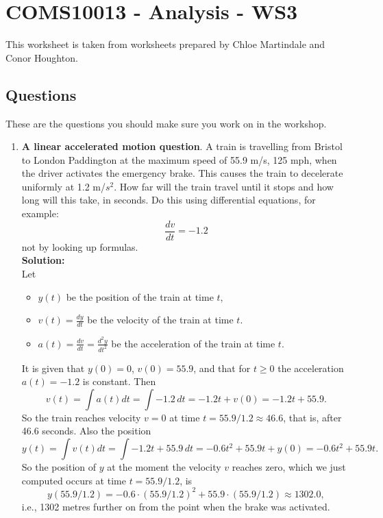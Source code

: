 \documentclass[11pt,a4paper]{scrartcl}
\begin{document}
\section*{COMS10013 - Analysis - WS3}

This worksheet is taken from worksheets prepared by Chloe Martindale and Conor Houghton.

\subsection*{Questions}

These are the questions you should make sure you work on in the workshop.

\begin{enumerate}

\item \textbf{A linear accelerated motion question}. A train is travelling from Bristol to London Paddington at the maximum speed of 55.9 m/s, 125 mph, when the driver activates the emergency brake. This causes the train to decelerate uniformly at 1.2 m/$s^2$. How far will the train travel until it stops and how long will this take, in seconds. Do this using differential equations, for example:
  \begin{equation}
    \frac{dv}{dt}=-1.2
  \end{equation}
  not by looking up formulas.
	\\
	\textbf{Solution:}
	\\
	Let 
	\begin{itemize}
		\item $y(t)$ be the position of the train at time $t$,
		\item $v(t) = \frac{dy}{dt}$ be the velocity of the train at time $t$.
		\item $a(t) = \frac{dv}{dt} = \frac{d^2y}{dt^2}$ be the acceleration of the train at time $t$.
	\end{itemize}
	It is given that $y(0) = 0$, $v(0) = 55.9$, and that for $t\geq 0$ the acceleration $a(t) = -1.2$ is constant.
	Then 
	$$v(t) = \int a(t) dt = \int -1.2 \, dt = -1.2t + v(0) = -1.2t + 55.9.$$
	So the train reaches velocity $v = 0$ at time $t = 55.9/1.2 \approx 46.6$,
	that is, after 46.6 seconds.
	Also the position
	$$y(t) = \int v(t) dt = \int -1.2t + 55.9 \, dt = 
	-0.6 t^2 + 55.9 t + y(0) = -0.6 t^2 + 55.9 t.$$
	So the position of $y$ at the moment the velocity $v$ reaches zero,
	which we just computed occurs at time $t = 55.9/1.2$, is
	$$y(55.9/1.2) = -0.6 \cdot (55.9/1.2)^2 + 55.9 \cdot (55.9/1.2) \approx 1302.0,$$
	i.e., 1302 metres further on from the point when the brake was activated.



\end{enumerate}
\end{document}
